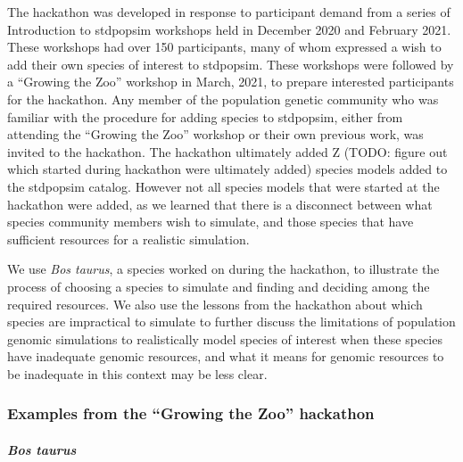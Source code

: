 \documentclass[hidelinks]{article}
\begin{document}
The hackathon was developed in response to participant demand from a
series of Introduction to stdpopsim workshops held in December 2020 and
February 2021. These workshops had over 150 participants, many of whom
expressed a wish to add their own species of interest to stdpopsim.
These workshops were followed by a ``Growing the Zoo'' workshop in
March, 2021, to prepare interested participants for the hackathon. Any
member of the population genetic community who was familiar with the
procedure for adding species to stdpopsim, either from attending the
``Growing the Zoo'' workshop or their own previous work, was invited to
the hackathon. The hackathon ultimately added Z (TODO: figure out which
started during hackathon were ultimately added) species models added to
the stdpopsim catalog. However not all species models that were started
at the hackathon were added, as we learned that there is a disconnect
between what species community members wish to simulate, and those
species that have sufficient resources for a realistic simulation.

We use \emph{Bos taurus}, a species worked on during the hackathon, to
illustrate the process of choosing a species to simulate and finding and
deciding among the required resources. We also use the lessons from the
hackathon about which species are impractical to simulate to further
discuss the limitations of population genomic simulations to
realistically model species of interest when these species have
inadequate genomic resources, and what it means for genomic resources to
be inadequate in this context may be less clear.

\hypertarget{examples-from-the-growing-the-zoo-hackathon}{%
\subsubsection{Examples from the ``Growing the Zoo''
hackathon}\label{examples-from-the-growing-the-zoo-hackathon}}

\hypertarget{bos-taurus}{%
\paragraph{\texorpdfstring{\emph{Bos
taurus}}{Bos taurus}}\label{bos-taurus}}
\end{document}

